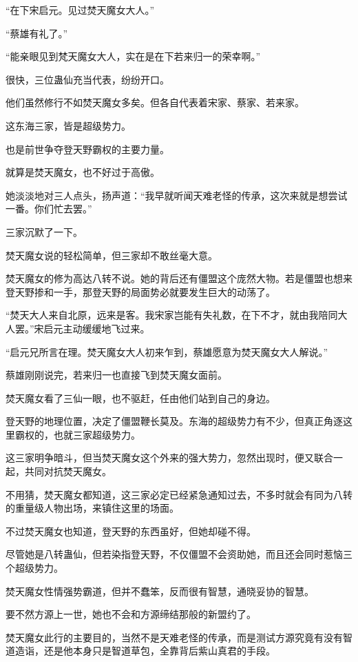 \begin{this_body}
“在下宋启元。见过焚天魔女大人。”

“蔡雄有礼了。”

“能亲眼见到梵天魔女大人，实在是在下若来归一的荣幸啊。”

很快，三位蛊仙充当代表，纷纷开口。

他们虽然修行不如焚天魔女多矣。但各自代表着宋家、蔡家、若来家。

这东海三家，皆是超级势力。

也是前世争夺登天野霸权的主要力量。

就算是焚天魔女，也不好过于高傲。

她淡淡地对三人点头，扬声道：“我早就听闻天难老怪的传承，这次来就是想尝试一番。你们忙去罢。”

三家沉默了一下。

焚天魔女说的轻松简单，但三家却不敢丝毫大意。

焚天魔女的修为高达八转不说。她的背后还有僵盟这个庞然大物。若是僵盟也想来登天野掺和一手，那登天野的局面势必就要发生巨大的动荡了。

“焚天大人来自北原，远来是客。我宋家岂能有失礼数，在下不才，就由我陪同大人罢。”宋启元主动缓缓地飞过来。

“启元兄所言在理。焚天魔女大人初来乍到，蔡雄愿意为焚天魔女大人解说。”

蔡雄刚刚说完，若来归一也直接飞到焚天魔女面前。

焚天魔女看了三仙一眼，也不驱赶，任由他们站到自己的身边。

登天野的地理位置，决定了僵盟鞭长莫及。东海的超级势力有不少，但真正角逐这里霸权的，也就三家超级势力。

这三家明争暗斗，但当焚天魔女这个外来的强大势力，忽然出现时，便又联合一起，共同对抗焚天魔女。

不用猜，焚天魔女都知道，这三家必定已经紧急通知过去，不多时就会有同为八转的重量级人物出场，来镇住这里的场面。

不过焚天魔女也知道，登天野的东西虽好，但她却碰不得。

尽管她是八转蛊仙，但若染指登天野，不仅僵盟不会资助她，而且还会同时惹恼三个超级势力。

焚天魔女性情强势霸道，但并不蠢笨，反而很有智慧，通晓妥协的智慧。

要不然方源上一世，她也不会和方源缔结那般的新盟约了。

焚天魔女此行的主要目的，当然不是天难老怪的传承，而是测试方源究竟有没有智道造诣，还是他本身只是智道草包，全靠背后紫山真君的手段。

\end{this_body}

